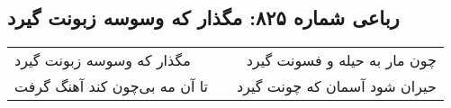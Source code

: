 \begin{center}
\section*{رباعی شماره ۸۲۵: مگذار که وسوسه زبونت گیرد}
\label{sec:0825}
\begin{longtable}{l p{0.5cm} r}
مگذار که وسوسه زبونت گیرد
&&
چون مار به حیله و فسونت گیرد
\\
تا آن مه بی‌چون کند آهنگ گرفت
&&
حیران شود آسمان که چونت گیرد
\\
\end{longtable}
\end{center}
